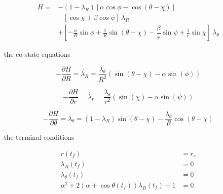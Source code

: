 \begin{equation*}
	\begin{split}
		H = & -(1-\lambda_R) [\alpha \cos \phi - \cos(\theta - \chi)]\\
		& - [\cos\chi + \beta \cos \psi ]\ \lambda_R \\
		& + [-\frac{\alpha}{R} \sin \phi + \frac{1}{R} \sin (\theta - \chi) - \dfrac{\beta}{r} \sin \psi + \frac{1}{r} \sin \chi ]\ \lambda_\theta 
	\end{split}
\end{equation*}

the co-state equations

\begin{equation}
	-\frac{\partial H}{\partial R} = \dot{\lambda_R}=\frac{\lambda_\theta}{R^2} (\sin(\theta - \chi) -\alpha \sin(\phi) )
\label{lambda R dot}
\end{equation}


\begin{equation}
-\frac{\partial H}{\partial r} = \dot{\lambda_r}=\frac{\lambda_\theta}{r^2} (\sin(\chi) -\alpha \sin(\psi) )
\label{lambda r dot}
\end{equation}

\begin{equation}
-\frac{\partial H}{\partial \theta} = \dot{\lambda_\theta}=(1- \lambda_R) \sin(\theta - \chi) - \frac{\lambda_\theta}{R} \cos(\theta - \chi)
\label{lambda theta dot}
\end{equation}


the terminal conditions 

\begin{equation}
\begin{split}
	r(t_f)&=r_c\\
\lambda_R(t_f)&=0\\
\lambda_\theta(t_f)&=0\\
\alpha^2 + 2(\alpha + \cos\theta(t_f)) \lambda_R(t_f)-1&=0
\end{split}
\label{terminal conditions}
\end{equation}



